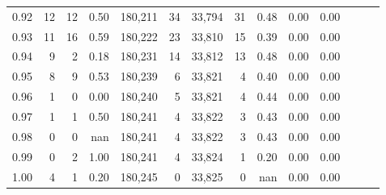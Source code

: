 \begin{tabular}{rrrrrrrrrrrrrr}
0.92 &     12 &     12 &  0.50 &  180,211 &       34 &  33,794 &      31 &  0.48 &  0.00 &      0.00 \\
0.93 &     11 &     16 &  0.59 &  180,222 &       23 &  33,810 &      15 &  0.39 &  0.00 &      0.00 \\
0.94 &      9 &      2 &  0.18 &  180,231 &       14 &  33,812 &      13 &  0.48 &  0.00 &      0.00 \\
0.95 &      8 &      9 &  0.53 &  180,239 &        6 &  33,821 &       4 &  0.40 &  0.00 &      0.00 \\
0.96 &      1 &      0 &  0.00 &  180,240 &        5 &  33,821 &       4 &  0.44 &  0.00 &      0.00 \\
0.97 &      1 &      1 &  0.50 &  180,241 &        4 &  33,822 &       3 &  0.43 &  0.00 &      0.00 \\
0.98 &      0 &      0 &   nan &  180,241 &        4 &  33,822 &       3 &  0.43 &  0.00 &      0.00 \\
0.99 &      0 &      2 &  1.00 &  180,241 &        4 &  33,824 &       1 &  0.20 &  0.00 &      0.00 \\
1.00 &      4 &      1 &  0.20 &  180,245 &        0 &  33,825 &       0 &   nan &  0.00 &      0.00 \\
\bottomrule
\end{tabular}
